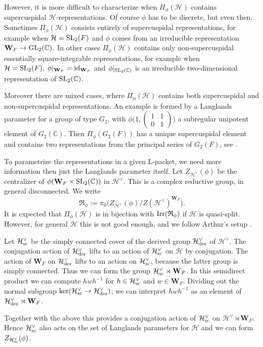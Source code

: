 \documentclass[11pt]{amsart}
\theoremstyle{definition}
\newcommand{\mb}{\mathbf}
\newcommand{\C}{\mathbb C}
\newcommand{\matje}[4]{\left(\begin{smallmatrix} #1 & #2 \\ 
#3 & #4 \end{smallmatrix}\right)}
\def\Irr{{\rm Irr}}
\def\GL{{\rm GL}}
\def\SL{{\rm SL}}
\def\cH{{\mathcal H}}
\def\cR{{\mathfrak R}}
\def\der{{\rm der}}
\def\sc{{\rm sc}}
\begin{document}
However, it is more difficult to characterize when $\Pi_\phi (\cH)$ contains
supercuspidal $\cH$-representations. Of course $\phi$ has to be discrete, but
even then. Sometimes $\Pi_\phi (\cH)$ consists entirely of supercuspidal
representations, for example when $\cH = \SL_2 (F)$ and $\phi$ comes from an
irreducible representation $\mb W_F \to \GL_2 (\C)$. In other cases $\Pi_\phi (\cH)$
contains only non-supercuspidal essentially square-integrable representations,
for example when $\cH = \SL_2 (F) ,\; \phi|_{\mb W_F} = \mathrm{id}_{\mb W_F}$
and $\phi |_{\SL_2 (\C)}$ is an irreducible two-dimensional representation of
$\SL_2 (\C)$. 

Moreover there are mixed cases, where $\Pi_\phi (\cH)$ contains both supercuspidal
and non-supercuspidal representations. An example is formed by a Langlands 
parameter for a group of type $G_2$, with $\phi \big( 1,\matje{1}{1}{0}{1} \big)$
a subregular unipotent element of $G_2 (\C)$. Then $\Pi_\phi (G_2 (F))$ has a 
unique supercuspidal element and contains two representations from the principal
series of $G_2 (F)$, see \cite{Lus2}.

To parametrize the representations in a given L-packet, we need more information 
then just the Langlands parameter itself. Let $Z_{\cH^\vee}(\phi)$ be the 
centralizer of $\phi (\mb W_F \times \SL_2 (\C))$ in $\cH^\vee$. This is a complex
reductive group, in general disconnected. We write 
\begin{equation} \label{eqn:R-group}
\cR_\phi := \pi_0 \big( Z_{\cH^\vee}(\phi) / Z(\cH^\vee)^{\mb W_F} \big).
\end{equation}
It is expected that $\Pi_\phi (\cH)$ is in bijection with $\Irr (\cR_\phi)$ if 
$\cH$ is quasi-split. However, for general $\cH$ this is not good enough, and we 
follow Arthur's setup \cite{Art2}. 

Let $\cH^\vee_{\sc}$ be the simply connected cover of the derived 
group $\cH^\vee_\der$ of $\cH^\vee$. The conjugation action of
$\cH^\vee_\der$ lifts to an action of $\cH^\vee_\sc$ on $\cH$ by conjugation. 
The action of $\mb W_F$ on $\cH^\vee_\der$ lifts to an action on $\cH^\vee_\sc$,
because the latter group is simply connected. Thus we can form the group
$\cH^\vee_\sc \rtimes \mb W_F$. In this semidirect product we can compute $h w h^{-1}$ 
for $h \in \cH^\vee_\sc$ and $w \in \mb W_F$. Dividing out the normal subgroup
$\ker (\cH^\vee_\sc \to \cH^\vee_\der)$, we can interpret $h w h^{-1}$ as an element
of $\cH^\vee_\der \rtimes \mb W_F$. 

Together with the above this provides a conjugation action of $\cH^\vee_\sc$ on 
$\cH^\vee \rtimes \mb W_F$. Hence $\cH^\vee_\sc$ also acts on the set of Langlands 
parameters for $\cH$ and we can form $Z_{\cH^\vee_\sc}(\phi)$.
\end{document}
